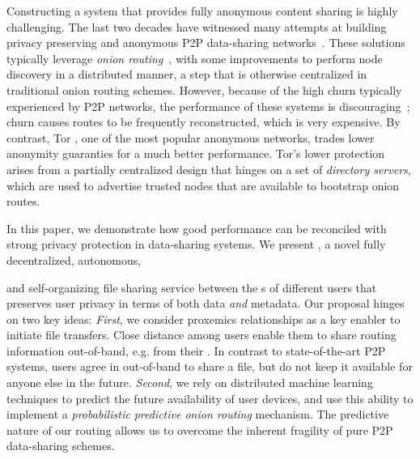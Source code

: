 Constructing a system that provides fully anonymous content sharing is highly
challenging. The last two decades have witnessed many attempts at building privacy preserving and anonymous P2P data-sharing
networks~\cite{Clarke:2001,Gnunet2002,Freedman:2002,Nambiar:2006,Rennhard:2002}.
These solutions typically leverage \emph{onion
 routing}~\cite{Chaum:1981}, with some improvements to perform node
 discovery in a distributed manner, a step that is otherwise
centralized in traditional onion routing schemes. However, because of the high
churn typically experienced by P2P networks, the performance of these systems is
discouraging~\cite{LeBlond:2013}; churn causes routes to be frequently
reconstructed, which is very expensive. By contrast, Tor
\cite{Dingledine:2004}, one of the most popular anonymous networks,
trades lower anonymity guaranties for a much better performance. Tor's lower protection arises from
a partially centralized design that hinges on a set of \emph{directory
servers}, which are used to advertise trusted nodes that are available to bootstrap onion
routes. 

In this paper, we demonstrate how good performance can be reconciled
with strong privacy protection in data-sharing systems. We present
\name{}, a novel fully decentralized, autonomous,

and self-organizing file sharing service between the \squad{}s of different users that preserves user privacy
in terms of both data \emph{and} metadata. Our proposal hinges on two key ideas: \emph{First}, we consider proxemics relationships as a key enabler to initiate file
transfers. Close distance among users enable them to share
routing information out-of-band, e.g. from their
\squad. In contrast to state-of-the-art P2P systems, users agree in \name out-of-band to share a file, but
do not keep it available for anyone else in the future. \emph{Second}, we
rely on distributed machine learning techniques to predict the future
availability of user devices, and use this ability to implement a \emph{probabilistic predictive onion routing} mechanism. The predictive nature of our routing allows us to overcome the inherent fragility of pure P2P data-sharing schemes.


